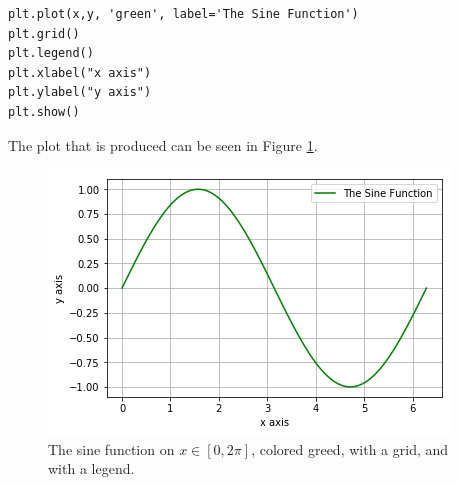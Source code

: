 \begin{example}
\bcode
\begin{lstlisting}
plt.plot(x,y, 'green', label='The Sine Function')
plt.grid()
plt.legend()
plt.xlabel("x axis")
plt.ylabel("y axis")
plt.show()
\end{lstlisting}
The plot that is produced can be seen in Figure \ref{fig:matplotlib_1}.
\end{example}

\begin{figure}[ht!]
    \centering
    \includegraphics[width=0.7\columnwidth]{Images/matplotlib_1.png}
    \caption{The sine function on $x\in [0,2\pi]$, colored greed, with a grid, and with a
    legend.}
    \label{fig:matplotlib_1}
\end{figure}

